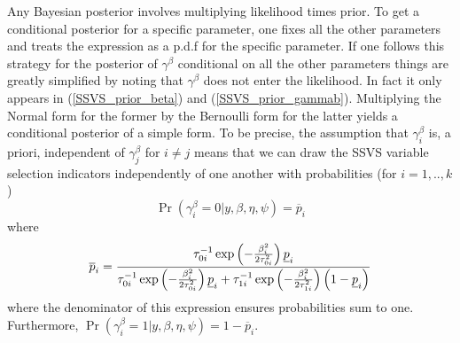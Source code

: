 \documentclass{article}
\begin{document}
Any Bayesian posterior involves multiplying likelihood times prior. To get a
conditional posterior for a specific parameter, one fixes all the other
parameters and treats the expression as a p.d.f for the specific parameter.
If one follows this strategy for the posterior of $\gamma ^{\beta }$
conditional on all the other parameters things are greatly simplified by
noting that $\gamma ^{\beta }$ does not enter the likelihood. In fact it
only appears in (\ref{SSVS_prior_beta}) and (\ref{SSVS_prior_gammab}).
Multiplying the Normal form for the former by the Bernoulli form for the
latter yields a conditional posterior of a simple form. To be precise, the
assumption that $\gamma _{i}^{\beta }$ is, a priori, independent of $\gamma
_{j}^{\beta }$ for $i\neq j$ means that we can draw the SSVS variable
selection indicators independently of one another with probabilities (for $%
i=1,..,k$) 
\begin{equation*}
\Pr \left( \gamma _{i}^{\beta }=0|y,\beta ,\eta ,\psi \right) =\overline{p}%
_{i}
\end{equation*}%
where 
\begin{equation*}
\overline{p}_{i}=\frac{\tau _{0i}^{-1}\exp \left( -\frac{\beta _{i}^{2}}{%
2\tau _{0i}^{2}}\right) \underline{p}_{i}}{\tau _{0i}^{-1}\exp \left( -\frac{%
\beta _{i}^{2}}{2\tau _{0i}^{2}}\right) \underline{p}_{i}+\tau
_{1i}^{-1}\exp \left( -\frac{\beta _{i}^{2}}{2\tau _{1i}^{2}}\right) \left(
1-\underline{p}_{i}\right) }
\end{equation*}%
where the denominator of this expression ensures probabilities sum to one.
Furthermore, $\Pr \left( \gamma _{i}^{\beta }=1|y,\beta ,\eta ,\psi \right)
=1-\overline{p}_{i}$.
\end{document}
